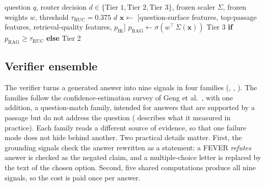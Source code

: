 \begin{algorithm}[!htbp]
\caption[Retrieval-utility classifier (Stage~3b).]{Retrieval-utility classifier (Stage~3b).}
\label{alg:ruc}
\begin{algorithmic}[1]
\Require question $q$, router decision $d \in \{\text{Tier 1}, \text{Tier 2}, \text{Tier 3}\}$, frozen scaler $\Sigma$, frozen weights $w$, threshold $\tau_{\text{RUC}} = 0.375$
    \State \Return $d$ 
\EndIf
\State $\mathbf{x} \gets$ [question-surface features, top-passage features, retrieval-quality features, $p_{\text{IK}}$]
\State $p_{\text{RAG}} \gets \sigma\!\left(w^{\top}\, \Sigma(\mathbf{x})\right)$
\State \Return Tier 3 \textbf{if} $p_{\text{RAG}} \ge \tau_{\text{RUC}}$ \textbf{else} Tier 2
\end{algorithmic}
\end{algorithm}

\subsection{Verifier ensemble}
\label{sec:verifier}

The verifier turns a generated answer into nine signals in four families (, , ). The families follow the confidence-estimation survey of Geng et al.~\cite{geng2024survey}, with one addition, a question-match family, intended for answers that are supported by a passage but do not address the question ( describes what it measured in practice). Each family reads a different source of evidence, so that one failure mode does not hide behind another. Two practical details matter. First, the grounding signals check the answer rewritten as a statement: a FEVER \emph{refutes} answer is checked as the negated claim, and a multiple-choice letter is replaced by the text of the chosen option. Second, five shared computations produce all nine signals, so the cost is paid once per answer.



